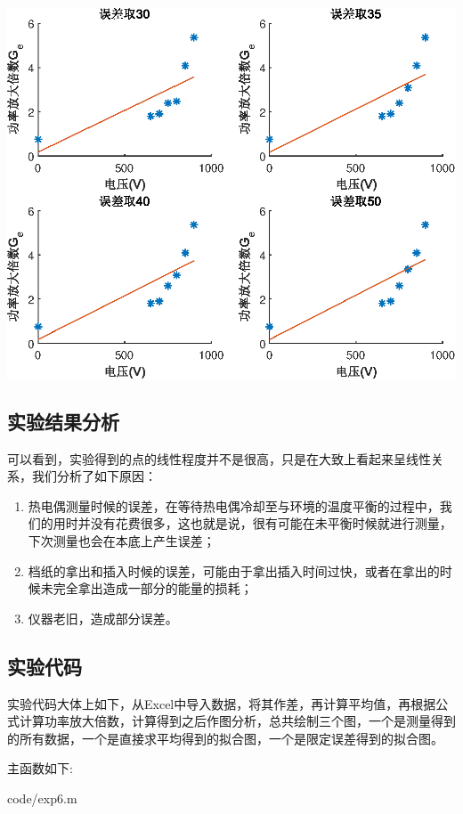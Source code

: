 \documentclass[UTF8]{ctexart}
\makeatletter
\newcommand{\figcaption}{\def\@captype{figure}\caption}
\makeatother
\begin{document}
\begin{center}
	\includegraphics{Nd_DiffErr.eps}
	\figcaption{不同误差范围再拟合}\label{fitdiff}
\end{center}
	\subsection{实验结果分析}	
可以看到，实验得到的点的线性程度并不是很高，只是在大致上看起来呈线性关系，我们分析了如下原因：
\begin{enumerate}
	\item 热电偶测量时候的误差，在等待热电偶冷却至与环境的温度平衡的过程中，我们的用时并没有花费很多，这也就是说，很有可能在未平衡时候就进行测量，下次测量也会在本底上产生误差；
	\item 档纸的拿出和插入时候的误差，可能由于拿出插入时间过快，或者在拿出的时候未完全拿出造成一部分的能量的损耗；
	\item 仪器老旧，造成部分误差。
\end{enumerate}
	

	\subsection{实验代码}
实验代码大体上如下，从Excel中导入数据，将其作差，再计算平均值，再根据公式计算功率放大倍数，计算得到之后作图分析，总共绘制三个图，一个是测量得到的所有数据，一个是直接求平均得到的拟合图，一个是限定误差得到的拟合图。
	
主函数如下:
		
		{code/exp6.m}
	
\end{document}
